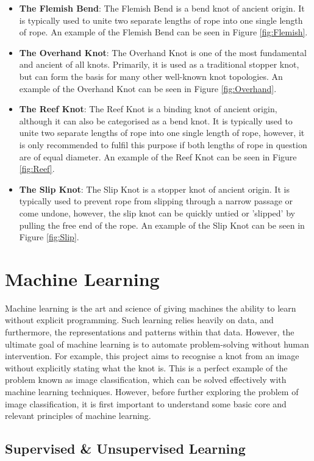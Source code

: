 \documentclass{l4proj}
\begin{document}
\begin{itemize}
	\item \textbf{The Flemish Bend}: The Flemish Bend is a bend knot of ancient origin. It is typically used to unite two separate lengths of rope into one single length of rope. An example of the Flemish Bend can be seen in Figure \ref{fig:Flemish}.
	\item \textbf{The Overhand Knot}: The Overhand Knot is one of the most fundamental and ancient of all knots. Primarily, it is used as a traditional stopper knot, but can form the basis for many other well-known knot topologies. An example of the Overhand Knot can be seen in Figure \ref{fig:Overhand}.
	\item \textbf{The Reef Knot}: The Reef Knot is a binding knot of ancient origin, although it can also be categorised as a bend knot. It is typically used to unite two separate lengths of rope into one single length of rope, however, it is only recommended to fulfil this purpose if both lengths of rope in question are of equal diameter. An example of the Reef Knot can be seen in Figure \ref{fig:Reef}.
	\item \textbf{The Slip Knot}: The Slip Knot is a stopper knot of ancient origin. It is typically used to prevent rope from slipping through a narrow passage or come undone, however, the slip knot can be quickly untied or 'slipped' by pulling the free end of the rope. An example of the Slip Knot can be seen in Figure \ref{fig:Slip}.
\end{itemize}  

\section{Machine Learning}
Machine learning is the art and science of giving machines the ability to learn without explicit programming.
Such learning relies heavily on data, and furthermore, the representations and patterns within that data. 
However, the ultimate goal of machine learning is to automate problem-solving without human intervention.
For example, this project aims to recognise a knot from an image without explicitly stating what the knot is.
This is a perfect example of the problem known as image classification, which can be solved effectively with machine learning techniques.
However, before further exploring the problem of image classification, it is first important to understand some basic core and relevant principles of machine learning.

\subsection{Supervised \& Unsupervised Learning}
\end{document}
